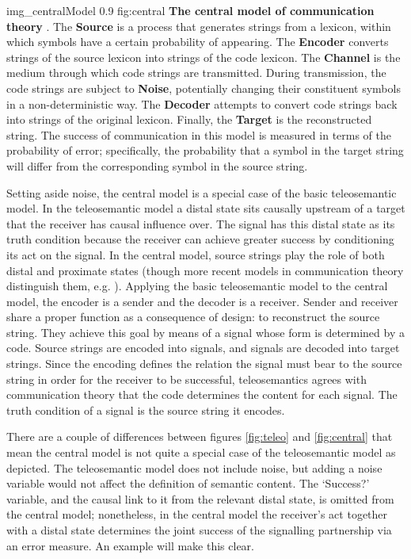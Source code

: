 \documentclass[12pt]{article}
\begin{document}
\begin{myfig}
    {img_centralModel} %
    {0.9} %
    {fig:central} %
    {\textbf{The central model of communication theory} \citep[adapted from][p. 381 fig. 1]{shannon1948mathematicalc}. 
    The \textbf{Source} is a process that generates strings from a lexicon, within which symbols have a certain probability of appearing. 
    The \textbf{Encoder} converts strings of the source lexicon into strings of the code lexicon. 
    The \textbf{Channel} is the medium through which code strings are transmitted. 
    During transmission, the code strings are subject to \textbf{Noise}, potentially changing their constituent symbols in a non-deterministic way. 
    The \textbf{Decoder} attempts to convert code strings back into strings of the original lexicon. 
    Finally, the \textbf{Target} is the reconstructed string. 
    The success of communication in this model is measured in terms of the probability of error; specifically, the probability that a symbol in the target string will differ from the corresponding symbol in the source string.
    } %
\end{myfig}


Setting aside noise, the central model is a special case of the basic teleosemantic model.
In the teleosemantic model a distal state sits causally upstream of a target that the receiver has causal influence over.
The signal has this distal state as its truth condition because the receiver can achieve greater success by conditioning its act on the signal.
In the central model, source strings play the role of both distal and proximate states (though more recent models in communication theory distinguish them, e.g. \citet{berger1996ceo}).
Applying the basic teleosemantic model to the central model, the encoder is a sender and the decoder is a receiver.
Sender and receiver share a proper function as a consequence of design: to reconstruct the source string.
They achieve this goal by means of a signal whose form is determined by a code.
Source strings are encoded into signals, and signals are decoded into target strings.
Since the encoding defines the relation the signal must bear to the source string in order for the receiver to be successful, teleosemantics agrees with communication theory that the code determines the content for each signal.
The truth condition of a signal is the source string it encodes.

There are a couple of differences between figures \ref{fig:teleo} and \ref{fig:central} that mean the central model is not quite a special case of the teleosemantic model as depicted.
The teleosemantic model does not include noise, but adding a noise variable would not affect the definition of semantic content.
The `Success?' variable, and the causal link to it from the relevant distal state, is omitted from the central model; nonetheless, in the central model the receiver's act together with a distal state determines the joint success of the signalling partnership via an error measure.
An example will make this clear.
\end{document}
